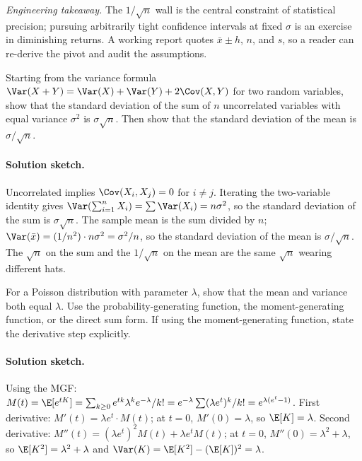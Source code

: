 \textit{Engineering takeaway.} The $1/\sqrt{n}$ wall is the central
constraint of statistical precision; pursuing arbitrarily tight
confidence intervals at fixed $\sigma$ is an exercise in
diminishing returns. A working report quotes
$\bar{x} \pm h$, $n$, and $s$, so a reader can re-derive the pivot
and audit the assumptions.

\begin{exercise}
Starting from the variance formula $\Var(X + Y) = \Var(X) + \Var(Y)
+ 2\Cov(X, Y)$ for two random variables, show that the standard
deviation of the sum of $n$ uncorrelated variables with equal
variance $\sigma^{2}$ is $\sigma\sqrt{n}$. Then show that the
standard deviation of the mean is $\sigma/\sqrt{n}$.
\end{exercise}

\paragraph{Solution sketch.}
Uncorrelated implies $\Cov(X_{i}, X_{j}) = 0$ for $i \neq j$.
Iterating the two-variable identity gives $\Var(\sum_{i=1}^{n}
X_{i}) = \sum \Var(X_{i}) = n\sigma^{2}$, so the standard deviation
of the sum is $\sigma\sqrt{n}$. The sample mean is the sum divided
by $n$; $\Var(\bar{x}) = (1/n^{2}) \cdot n\sigma^{2} =
\sigma^{2}/n$, so the standard deviation of the mean is
$\sigma/\sqrt{n}$. The $\sqrt{n}$ on the sum and the $1/\sqrt{n}$
on the mean are the same $\sqrt{n}$ wearing different hats.

\begin{exercise}
For a Poisson distribution with parameter $\lambda$, show that the
mean and variance both equal $\lambda$. Use the
probability-generating function, the moment-generating function,
or the direct sum form. If using the moment-generating function,
state the derivative step explicitly.
\end{exercise}

\paragraph{Solution sketch.}
Using the MGF: $M(t) = \E[e^{tK}] = \sum_{k \geq 0} e^{tk}
\lambda^{k} e^{-\lambda}/k! = e^{-\lambda} \sum (\lambda e^{t})^{k}
/k! = e^{\lambda(e^{t} - 1)}$. First derivative: $M'(t) = \lambda
e^{t} \cdot M(t)$; at $t = 0$, $M'(0) = \lambda$, so $\E[K] =
\lambda$. Second derivative: $M''(t) = (\lambda e^{t})^{2} M(t) +
\lambda e^{t} M(t)$; at $t = 0$, $M''(0) = \lambda^{2} + \lambda$,
so $\E[K^{2}] = \lambda^{2} + \lambda$ and $\Var(K) = \E[K^{2}] -
(\E[K])^{2} = \lambda$.

